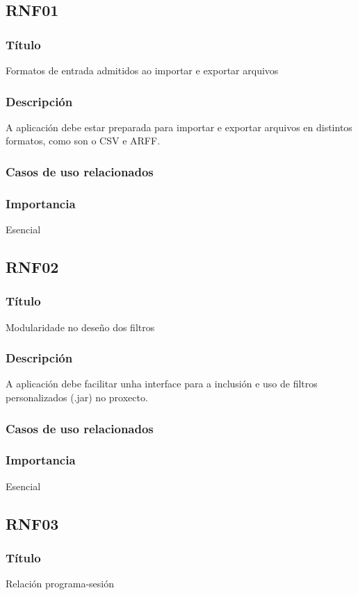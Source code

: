 \subsection*{RNF01}
\subsubsection{Título}
Formatos de entrada admitidos ao importar e exportar arquivos
\subsubsection{Descripción}
A aplicación debe estar preparada para importar e exportar arquivos en distintos formatos, como son o CSV e ARFF.
\subsubsection{Casos de uso relacionados}
\subsubsection{Importancia}
Esencial

\subsection*{RNF02}
\subsubsection{Título}
Modularidade no deseño dos filtros
\subsubsection{Descripción}
A aplicación debe facilitar unha interface para a inclusión e uso de filtros personalizados (.jar) no proxecto.
\subsubsection{Casos de uso relacionados}
\subsubsection{Importancia}
Esencial

\subsection*{RNF03}
\subsubsection{Título}
Relación programa-sesión
